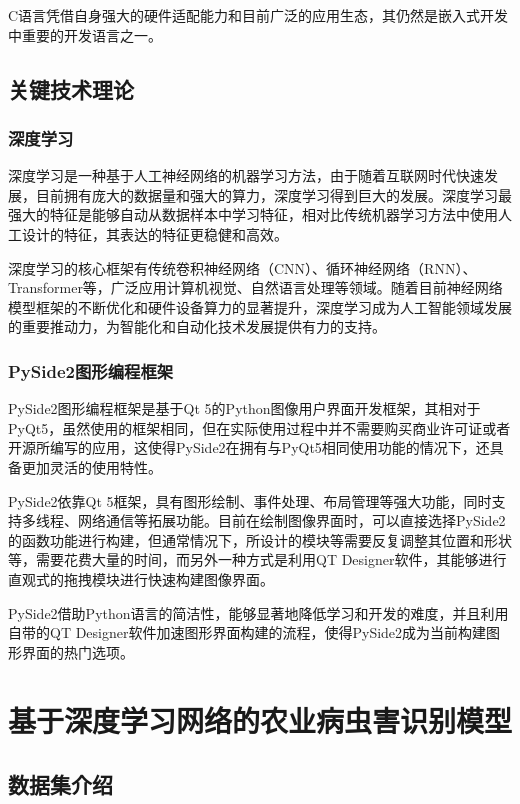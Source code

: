 \documentclass[12pt, a4paper, twoside]{ctexart}
\begin{document}
C语言凭借自身强大的硬件适配能力和目前广泛的应用生态，其仍然是嵌入式开发中重要的开发语言之一。


\section{关键技术理论}


\subsection{深度学习}

深度学习是一种基于人工神经网络的机器学习方法，由于随着互联网时代快速发展，目前拥有庞大的数据量和强大的算力，深度学习得到巨大的发展。深度学习最强大的特征是能够自动从数据样本中学习特征，相对比传统机器学习方法中使用人工设计的特征，其表达的特征更稳健和高效。

深度学习的核心框架有传统卷积神经网络（CNN）、循环神经网络（RNN）、Transformer等，广泛应用计算机视觉、自然语言处理等领域。随着目前神经网络模型框架的不断优化和硬件设备算力的显著提升，深度学习成为人工智能领域发展的重要推动力，为智能化和自动化技术发展提供有力的支持。


\subsection{PySide2图形编程框架}

PySide2图形编程框架是基于Qt 5的Python图像用户界面开发框架，其相对于PyQt5，虽然使用的框架相同，但在实际使用过程中并不需要购买商业许可证或者开源所编写的应用，这使得PySide2在拥有与PyQt5相同使用功能的情况下，还具备更加灵活的使用特性。

PySide2依靠Qt 5框架，具有图形绘制、事件处理、布局管理等强大功能，同时支持多线程、网络通信等拓展功能。目前在绘制图像界面时，可以直接选择PySide2的函数功能进行构建，但通常情况下，所设计的模块等需要反复调整其位置和形状等，需要花费大量的时间，而另外一种方式是利用QT Designer软件，其能够进行直观式的拖拽模块进行快速构建图像界面。

PySide2借助Python语言的简洁性，能够显著地降低学习和开发的难度，并且利用自带的QT Designer软件加速图形界面构建的流程，使得PySide2成为当前构建图形界面的热门选项。


\chapter{基于深度学习网络的农业病虫害识别模型}


\section{数据集介绍}
\end{document}
